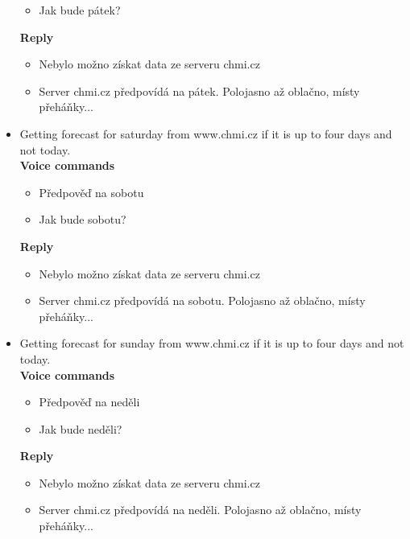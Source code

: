 \begin{itemize}
\begin{itemize}
        \item Jak bude pátek?
    \end{itemize}
    \textbf{Reply}
    \begin{itemize}
        \item Nebylo možno získat data ze serveru chmi.cz
        \item Server chmi.cz předpovídá na pátek. Polojasno až oblačno, místy přeháňky...
    \end{itemize}
    \item Getting forecast for saturday from www.chmi.cz if it is up to four days and not today.\\
    \textbf{Voice commands}
    \begin{itemize}
        \item Předpověď na sobotu
        \item Jak bude sobotu?
    \end{itemize}
    \textbf{Reply}
    \begin{itemize}
        \item Nebylo možno získat data ze serveru chmi.cz
        \item Server chmi.cz předpovídá na sobotu. Polojasno až oblačno, místy přeháňky...
    \end{itemize}
    \item Getting forecast for sunday from www.chmi.cz if it is up to four days and not today.\\
    \textbf{Voice commands}
    \begin{itemize}
        \item Předpověď na neděli
        \item Jak bude neděli?
    \end{itemize}
    \textbf{Reply}
    \begin{itemize}
        \item Nebylo možno získat data ze serveru chmi.cz
        \item Server chmi.cz předpovídá na neděli. Polojasno až oblačno, místy přeháňky...
    \end{itemize}
\end{itemize}
